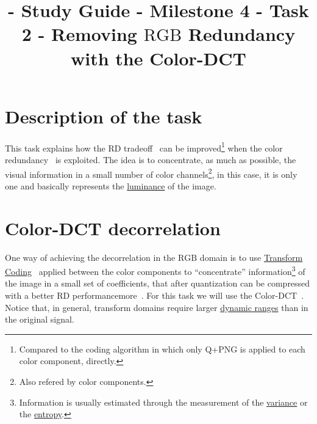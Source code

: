 

\title{\SM{} - Study Guide - Milestone 4 - Task 2 - Removing $\text{RGB}$ Redundancy with the Color-DCT}

\maketitle

\tableofcontents

\section{Description of the task}

This task explains how the RD
tradeoff~\cite{vruiz__information_theory} can be
improved\footnote{Compared to the coding algorithm in which only Q+PNG
is applied to each color component, directly.} when the color
redundancy~\cite{vruiz__visual_redundancy} is exploited. The idea is
to concentrate, as much as possible, the visual information in a small
number of color channels\footnote{Also refered by color components.},
in this case, it is only one and basically represents the
\href{https://en.wikipedia.org/wiki/Luminance}{luminance} of the
image.




\section{Color-DCT decorrelation}

One way of achieving the decorrelation in the $\text{RGB}$ domain is
to use
\href{https://vicente-gonzalez-ruiz.github.io/transform_coding/}{Transform
  Coding}~\cite{vruiz__transform_coding} applied between the color
components to ``concentrate'' information\footnote{Information is
usually estimated through the measurement of the
\href{https://en.wikipedia.org/wiki/Variance}{variance} or the
\href{https://en.wikipedia.org/wiki/Entropy}{entropy}.} of the image
in a small set of coefficients, that after quantization can be
compressed with a better RD
performancemore~\cite{vruiz__information_theory}. For this task we
will use the Color-DCT~\cite{vruiz__color_DCT}. Notice that, in
general, transform domains require larger
\href{https://en.wikipedia.org/wiki/Dynamic_range}{dynamic ranges}
than in the original signal.


